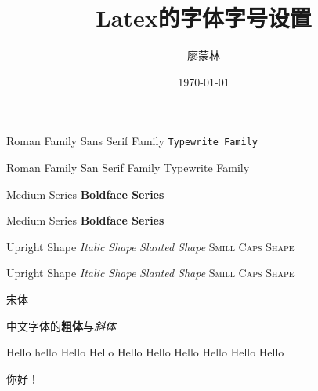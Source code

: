 \documentclass[fontset=windows]{ctexart}
\title{\heiti Latex的字体字号设置}
\author{\kaishu 廖蒙林}
\date{\today}
\begin{document}
    \maketitle
    \textrm{Roman Family} \textsf{Sans Serif Family} \texttt{Typewrite Family}

    {\rmfamily Roman Family} {\sffamily San Serif Family} {\ttfamily Typewrite Family}

    \textmd{Medium Series} \textbf{Boldface Series}

    {\mdseries Medium Series} {\bfseries Boldface Series}

    \textup{Upright Shape} \textit{Italic Shape}
    \textsl{Slanted Shape} \textsc{Smill Caps Shape}

    {\upshape Upright Shape} {\itshape Italic Shape}
    {\slshape Slanted Shape} {\scshape Smill Caps Shape}

    {\songti 宋体}   

    中文字体的\textbf{粗体}与\textit{斜体}

    {\tiny          Hello}
    {\scriptsize    hello}
    {\footnotesize  Hello}
    {\small         Hello}
    {\normalsize    Hello}
    {\large         Hello}
    {\Large         Hello}
    {\LARGE         Hello}
    {\huge          Hello}
    {\Huge          Hello}

     你好！
\end{document}

